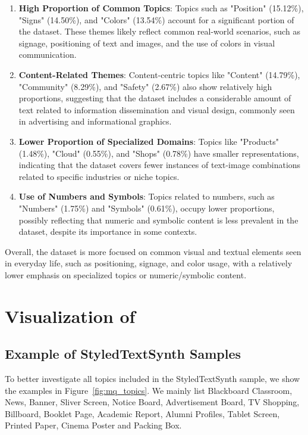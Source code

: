 \begin{enumerate}
    \item \textbf{High Proportion of Common Topics}: Topics such as "Position" (15.12\%), "Signs" (14.50\%), and "Colors" (13.54\%) account for a significant portion of the dataset. These themes likely reflect common real-world scenarios, such as signage, positioning of text and images, and the use of colors in visual communication.
    
    \item \textbf{Content-Related Themes}: Content-centric topics like "Content" (14.79\%), "Community" (8.29\%), and "Safety" (2.67\%) also show relatively high proportions, suggesting that the dataset includes a considerable amount of text related to information dissemination and visual design, commonly seen in advertising and informational graphics.
    
    \item \textbf{Lower Proportion of Specialized Domains}: Topics like "Products" (1.48\%), "Cloud" (0.55\%), and "Shops" (0.78\%) have smaller representations, indicating that the dataset covers fewer instances of text-image combinations related to specific industries or niche topics.
    
    \item \textbf{Use of Numbers and Symbols}: Topics related to numbers, such as "Numbers" (1.75\%) and "Symbols" (0.61\%), occupy lower proportions, possibly reflecting that numeric and symbolic content is less prevalent in the dataset, despite its importance in some contexts.
\end{enumerate}

Overall, the dataset is more focused on common visual and textual elements seen in everyday life, such as positioning, signage, and color usage, with a relatively lower emphasis on specialized topics or numeric/symbolic content.






\clearpage

\section{Visualization of \DatasetName}


\subsection{Example of StyledTextSynth Samples}
To better investigate all topics included in the StyledTextSynth sample, we show the examples in Figure~\ref{fig:mq_topics}.
We mainly list Blackboard Classroom, News, Banner, Sliver Screen, Notice Board, Advertisement Board, TV Shopping, Billboard, Booklet Page, Academic Report, Alumni Profiles, Tablet Screen, Printed Paper, Cinema Poster and Packing Box.

